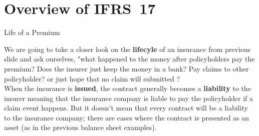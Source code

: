\documentclass[aspectratio=169]{beamer}
\begin{document}
\section{Overview of IFRS~17}
\begin{frame}{Life of a Premium}
  \begin{center}
  \end{center}
We are going to take a closer look on the \textbf{lifecyle} of an insurance from previous slide and ask ourselves, "what happened to the money after policyholders pay the premium? Does the insurer just keep the money in a bank? Pay claims to other policyholder? or just hope that no claim will submitted ?\\
When the insurance is \textbf{issued}, the contract generally becomes a \textbf{liability} to the insurer meaning that the insurance company is liable to pay the policyholder if a claim event happens. But it doesn't mean that every contract will be a liability to the insurance company; there are cases where the contract is presented as an asset (as in the previous balance sheet examples).
\end{frame}
\end{document}
